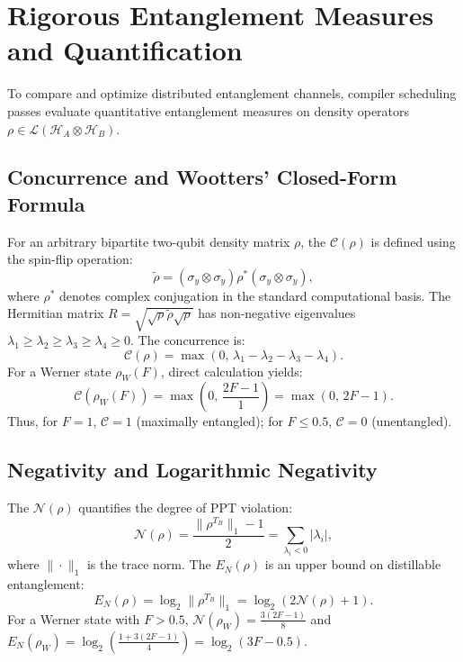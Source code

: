 \section{Rigorous Entanglement Measures and Quantification}
\label{sec:entanglement_quantification}

To compare and optimize distributed entanglement channels, compiler scheduling passes evaluate quantitative entanglement measures on density operators $\rho \in \mathcal{L}(\mathcal{H}_A \otimes \mathcal{H}_B)$.

\subsection{Concurrence and Wootters' Closed-Form Formula}
For an arbitrary bipartite two-qubit density matrix $\rho$, the  $\mathcal{C}(\rho)$ is defined using the spin-flip operation:
\begin{equation}
    \tilde{\rho} = \left( \sigma_y \otimes \sigma_y \right) \rho^* \left( \sigma_y \otimes \sigma_y \right),
\end{equation}
where $\rho^*$ denotes complex conjugation in the standard computational basis. The Hermitian matrix $R = \sqrt{\sqrt{\rho}\tilde{\rho}\sqrt{\rho}}$ has non-negative eigenvalues $\lambda_1 \ge \lambda_2 \ge \lambda_3 \ge \lambda_4 \ge 0$. The concurrence is:
\begin{equation}
    \mathcal{C}(\rho) = \max\left( 0, \, \lambda_1 - \lambda_2 - \lambda_3 - \lambda_4 \right).
    \label{eq:concurrence_wootters}
\end{equation}
For a Werner state $\rho_W(F)$, direct calculation yields:
\begin{equation}
    \mathcal{C}(\rho_W(F)) = \max\left( 0, \, \frac{2F - 1}{1} \right) = \max\left( 0, \, 2F - 1 \right).
\end{equation}
Thus, for $F = 1$, $\mathcal{C} = 1$ (maximally entangled); for $F \le 0.5$, $\mathcal{C} = 0$ (unentangled).

\subsection{Negativity and Logarithmic Negativity}
The  $\mathcal{N}(\rho)$ quantifies the degree of PPT violation:
\begin{equation}
    \mathcal{N}(\rho) = \frac{\|\rho^{T_B}\|_1 - 1}{2} = \sum_{\lambda_i < 0} |\lambda_i|,
\end{equation}
where $\|\cdot\|_1$ is the trace norm. The  $E_N(\rho)$ is an upper bound on distillable entanglement:
\begin{equation}
    E_N(\rho) = \log_2 \|\rho^{T_B}\|_1 = \log_2 \left( 2\mathcal{N}(\rho) + 1 \right).
\end{equation}
For a Werner state with $F > 0.5$, $\mathcal{N}(\rho_W) = \frac{3(2F - 1)}{8}$ and $E_N(\rho_W) = \log_2 \left( \frac{1 + 3(2F-1)}{4} \right) = \log_2(3F - 0.5)$.


